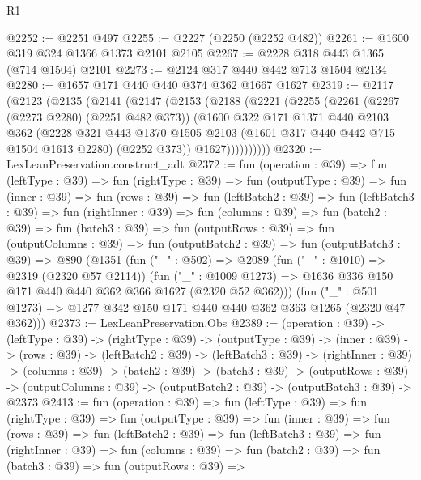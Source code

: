 \begin{lexlean}{R1}
\begin{coremodule}
@2252 := @2251 @497
@2255 := @2227 (@2250 (@2252 @482))
@2261 := @1600 @319 @324 @1366 @1373 @2101 @2105
@2267 := @2228 @318 @443 @1365 (@714 @1504) @2101
@2273 := @2124 @317 @440 @442 @713 @1504 @2134
@2280 := @1657 @171 @440 @440 @374 @362 @1667 @1627
@2319 := @2117
    (@2123
      (@2135
        (@2141
          (@2147
            (@2153
              (@2188
                (@2221
                  (@2255
                    (@2261
                      (@2267 (@2273 @2280) (@2251 @482 @373))
                      (@1600
                        @322
                        @171
                        @1371
                        @440
                        @2103
                        @362
                        (@2228
                          @321
                          @443
                          @1370
                          @1505
                          @2103
                          (@1601 @317 @440 @442 @715 @1504 @1613 @2280)
                          (@2252 @373))
                        @1627))))))))))
@2320 := LexLeanPreservation.construct_adt
@2372 := fun (operation : @39) =>
  fun (leftType : @39) =>
  fun (rightType : @39) =>
  fun (outputType : @39) =>
  fun (inner : @39) =>
  fun (rows : @39) =>
  fun (leftBatch2 : @39) =>
  fun (leftBatch3 : @39) =>
  fun (rightInner : @39) =>
  fun (columns : @39) =>
  fun (batch2 : @39) =>
  fun (batch3 : @39) =>
  fun (outputRows : @39) =>
  fun (outputColumns : @39) =>
  fun (outputBatch2 : @39) =>
  fun (outputBatch3 : @39) =>
  @890
    (@1351
      (fun ("_" : @502) =>
      @2089
        (fun ("_" : @1010) => @2319 (@2320 @57 @2114))
        (fun ("_" : @1009 @1273) =>
        @1636 @336 @150 @171 @440 @440 @362 @366 @1627 (@2320 @52 @362)))
      (fun ("_" : @501 @1273) => @1277 @342 @150 @171 @440 @440 @362 @363 @1265 (@2320 @47 @362)))
@2373 := LexLeanPreservation.Obs
@2389 := (operation : @39) ->
  (leftType : @39) ->
  (rightType : @39) ->
  (outputType : @39) ->
  (inner : @39) ->
  (rows : @39) ->
  (leftBatch2 : @39) ->
  (leftBatch3 : @39) ->
  (rightInner : @39) ->
  (columns : @39) ->
  (batch2 : @39) ->
  (batch3 : @39) ->
  (outputRows : @39) ->
  (outputColumns : @39) -> (outputBatch2 : @39) -> (outputBatch3 : @39) -> @2373
@2413 := fun (operation : @39) =>
  fun (leftType : @39) =>
  fun (rightType : @39) =>
  fun (outputType : @39) =>
  fun (inner : @39) =>
  fun (rows : @39) =>
  fun (leftBatch2 : @39) =>
  fun (leftBatch3 : @39) =>
  fun (rightInner : @39) =>
  fun (columns : @39) =>
  fun (batch2 : @39) =>
  fun (batch3 : @39) =>
  fun (outputRows : @39) =>

\end{coremodule}
\end{lexlean}
